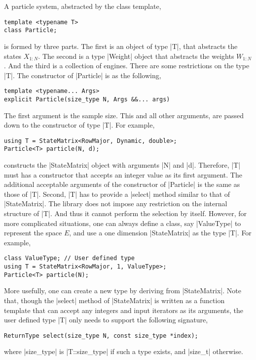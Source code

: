 A particle system, abstracted by the class template,
\begin{verbatim}
template <typename T>
class Particle;
\end{verbatim}
is formed by three parts. The first is an object of type |T|, that abstracts
the states $X_{1:N}$. The second is a type |Weight| object that abstracts the
weights $W_{1:N}$. And the third is a collection of \rng engines. There are
some restrictions on the type |T|. The constructor of |Particle| is as the
following,
\begin{verbatim}
template <typename... Args>
explicit Particle(size_type N, Args &&... args)
\end{verbatim}
The first argument is the sample size. This and all other arguments, are passed
down to the constructor of type |T|. For example,
\begin{verbatim}
using T = StateMatrix<RowMajor, Dynamic, double>;
Particle<T> particle(N, d);
\end{verbatim}
constructs the |StateMatrix| object with arguments |N| and |d|. Therefore, |T|
must has a constructor that accepts an integer value as its first argument. The
additional acceptable arguments of the constructor of |Particle| is the same as
those of |T|. Second, |T| has to provide a |select| method similar to that of
|StateMatrix|. The library does not impose any restriction on the internal
structure of |T|. And thus it cannot perform the selection by itself. However,
for more complicated situations, one can always define a class, say |ValueType|
to represent the space $E$, and use a one dimension |StateMatrix| as the type
|T|. For example,
\begin{verbatim}
class ValueType; // User defined type
using T = StateMatrix<RowMajor, 1, ValueType>;
Particle<T> particle(N);
\end{verbatim}
More usefully, one can create a new type by deriving from |StateMatrix|. Note
that, though the |select| method of |StateMatrix| is written as a function
template that can accept any integers and input iterators as its arguments, the
user defined type |T| only needs to support the following signature,
\begin{verbatim}
ReturnType select(size_type N, const size_type *index);
\end{verbatim}
where |size_type| is |T::size_type| if such a type exists, and |size_t|
otherwise.


